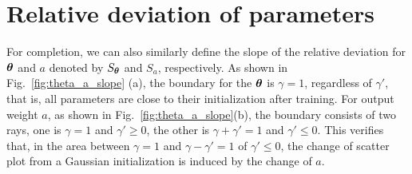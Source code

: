 \documentclass[twoside,11pt]{article}
\begin{document}

\section{Relative deviation of parameters}\label{sec:relapara}
For completion, we can also similarly define the slope of the relative deviation for $\bm{\theta}$ and $a$ denoted by $S_{\bm{\theta}}$ and $S_{a}$, respectively. As shown in
Fig.~\ref{fig:theta_a_slope} (a), the boundary for the $\bm{\theta}$ is $\gamma=1$, regardless of $\gamma'$, that is, all parameters are close to their initialization after training. For output weight $a$, as shown in Fig.~\ref{fig:theta_a_slope}(b), the boundary consists of two rays, one is  $\gamma=1$ and
$\gamma'\geq 0$, the other is $\gamma+\gamma'=1$ and $\gamma'\leq 0$. This verifies that, in the area between  $\gamma=1$ and $\gamma-\gamma'=1$ of  $\gamma'\leq 0$, the change of scatter plot from a Gaussian initialization is induced by the change of $a$.
\end{document}
